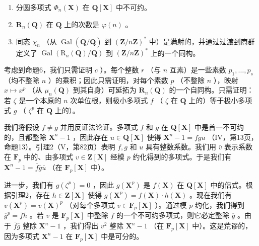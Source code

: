 \begin{enumerate}
\def\labelenumi{\alph{enumi})}
\item
  分圆多项式 \(\Phi_n(\mathbf{X})\) 在 \(\mathbf{Q}[\mathbf{X}]\) 中不可约。
\item
  \(\mathbf{R}_n(\mathbf{Q})\) 在 \(\mathbf{Q}\) 上的次数是 \(\varphi(n)\) 。
\item
  同态 \(\chi_{n}\) （从 \(\operatorname{Gal}(\bar{\mathbf{Q}} / \mathbf{Q})\) 到 \((\mathbf{Z} / n\mathbf{Z})^{*}\) 中）是满射的，并通过过渡到商群定义了 \(\operatorname{Gal}(\mathrm{R}_n(\mathbf{Q}) / \mathbf{Q})\) 到 \((\mathbf{Z} / n\mathbf{Z})^{*}\) 上的一个同构。
\end{enumerate}

考虑到命题6，我们只需证明 \(c\) ）。每个整数 \(r\) （与 \(n\) 互素）是一些素数 \(p_1, \ldots, p_s\) （均不整除 \(n\) ）的乘积；因此只需证明，对每个素数 \(p\) （不整除 \(n\) ），映射 \(x \mapsto x^p\) （从 \(\mu_n(\mathbf{Q})\) 到其自身）可延拓为 \(\mathbf{R}_n(\mathbf{Q})\) 的一个自同构。只需证明：若 \(\zeta\) 是一个本原的 \(n\) 次单位根，则极小多项式 \(f\) （ \(\zeta\) 在 \(\mathbf{Q}\) 上的）等于极小多项式 \(g\) （ \(\zeta^p\) 在 \(\mathbf{Q}\) 上的）。

我们将假设 \(f \neq g\) 并用反证法论证。多项式 \(f\) 和 \(g\) 在 \(\mathbf{Q}[\mathbf{X}]\) 中是首一不可约的，且都整除 \(\mathbf{X}^n - 1\) ，因此存在 \(u \in \mathbf{Q}[\mathbf{X}]\) 使得 \(\mathbf{X}^n - 1 = fgu\) （IV，第13页，命题13）。引理2（V，第82页）表明 \(f, g\) 和 \(u\) 具有整数系数。我们用 \(\bar{v}\) 表示系数在 \(\mathbf{F}_p\) 中的、由多项式 \(v \in \mathbf{Z}[\mathbf{X}]\) 经模 \(p\) 约化得到的多项式。于是我们有 \(\mathbf{X}^n - 1 = \bar{f}\bar{g}\bar{u}\) （在 \(\mathbf{F}_p[\mathbf{X}]\) 中）。

进一步，我们有 \(g(\zeta^p) = 0\) ，因此 \(g(\mathbf{X}^p)\) 是 \(f(\mathbf{X})\) 在 \(\mathbf{Q}[\mathbf{X}]\) 中的倍式。根据引理2，存在 \(h \in \mathbf{Z}[\mathbf{X}]\) 使得 \(g(\mathbf{X}^p) = f(\mathbf{X}) \cdot h(\mathbf{X})\) 。现在我们有 \(v(\mathbf{X}^p) = v(\mathbf{X})^p\) （对每个多项式 \(v \in \mathbf{F}_p[\mathbf{X}]\) ）。通过模 \(p\) 约化，我们得到 \(\overline{g}^p = \overline{f}\overline{h}\) 。若 \(v\) 是 \(\mathbf{F}_p[\mathbf{X}]\) 中整除 \(\overline{f}\) 的一个不可约多项式，则它必定整除 \(\overline{g}\) 。由于 \(\overline{f}\overline{g}\) 整除 \(\mathbf{X}^n - 1\) ，我们得出 \(v^2\) 整除 \(\mathbf{X}^n - 1\) （在 \(\mathbf{F}_p[\mathbf{X}]\) 中）。这是荒谬的，因为多项式 \(\mathbf{X}^n - 1\) 在 \(\mathbf{F}_p[\mathbf{X}]\) 中是可分的。

